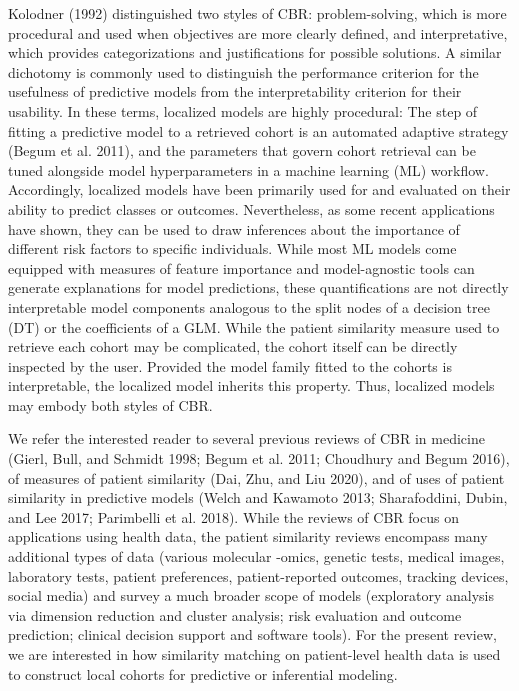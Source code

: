 \documentclass{article}
\begin{document}
Kolodner (1992) distinguished two styles of CBR: problem-solving, which
is more procedural and used when objectives are more clearly defined,
and interpretative, which provides categorizations and justifications
for possible solutions. A similar dichotomy is commonly used to
distinguish the performance criterion for the usefulness of predictive
models from the interpretability criterion for their usability. In these
terms, localized models are highly procedural: The step of fitting a
predictive model to a retrieved cohort is an automated adaptive strategy
(Begum et al. 2011), and the parameters that govern cohort retrieval can
be tuned alongside model hyperparameters in a machine learning (ML)
workflow. Accordingly, localized models have been primarily used for and
evaluated on their ability to predict classes or outcomes. Nevertheless,
as some recent applications have shown, they can be used to draw
inferences about the importance of different risk factors to specific
individuals. While most ML models come equipped with measures of feature
importance and model-agnostic tools can generate explanations for model
predictions, these quantifications are not directly interpretable model
components analogous to the split nodes of a decision tree (DT) or the
coefficients of a GLM. While the patient similarity measure used to
retrieve each cohort may be complicated, the cohort itself can be
directly inspected by the user. Provided the model family fitted to the
cohorts is interpretable, the localized model inherits this property.
Thus, localized models may embody both styles of CBR.

We refer the interested reader to several previous reviews of CBR in
medicine (Gierl, Bull, and Schmidt 1998; Begum et al. 2011; Choudhury
and Begum 2016), of measures of patient similarity (Dai, Zhu, and Liu
2020), and of uses of patient similarity in predictive models (Welch and
Kawamoto 2013; Sharafoddini, Dubin, and Lee 2017; Parimbelli et al.
2018). While the reviews of CBR focus on applications using health data,
the patient similarity reviews encompass many additional types of data
(various molecular -omics, genetic tests, medical images, laboratory
tests, patient preferences, patient-reported outcomes, tracking devices,
social media) and survey a much broader scope of models (exploratory
analysis via dimension reduction and cluster analysis; risk evaluation
and outcome prediction; clinical decision support and software tools).
For the present review, we are interested in how similarity matching on
patient-level health data is used to construct local cohorts for
predictive or inferential modeling.
\end{document}
